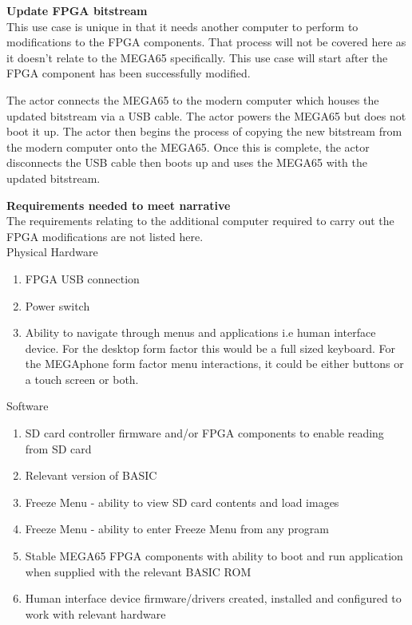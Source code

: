 \textbf{Update FPGA bitstream}\\
This use case is unique in that it needs another computer to perform to modifications to the FPGA components. That process will not be covered here as it doesn't relate to the MEGA65 specifically. This use case will start after the FPGA component has been successfully modified.

The actor connects the MEGA65 to the modern computer which houses the updated bitstream via a USB cable. The actor powers the MEGA65 but does not boot it up. The actor then begins the process of copying the new bitstream from the modern computer onto the MEGA65. Once this is complete, the actor disconnects the USB cable then boots up and uses the MEGA65 with the updated bitstream.

\textbf{Requirements needed to meet narrative}\\
The requirements relating to the additional computer required to carry out the FPGA modifications are not listed here.\\
Physical Hardware
\begin{enumerate}
\item FPGA USB connection
\item Power switch
\item Ability to navigate through menus and applications i.e human interface device. For the desktop form factor this would be a full sized keyboard. For the MEGAphone form factor menu interactions, it could be either buttons or a touch screen or both.
\end{enumerate}

Software\\
\begin{enumerate}
\item SD card controller firmware and/or FPGA components to enable reading from SD card
\item Relevant version of BASIC 
\item Freeze Menu - ability to view SD card contents and load images
\item Freeze Menu - ability to enter Freeze Menu from any program
\item Stable MEGA65 FPGA components with ability to boot and run application when supplied with the relevant BASIC ROM
\item Human interface device firmware/drivers created, installed and configured to work with relevant hardware
\end{enumerate}

